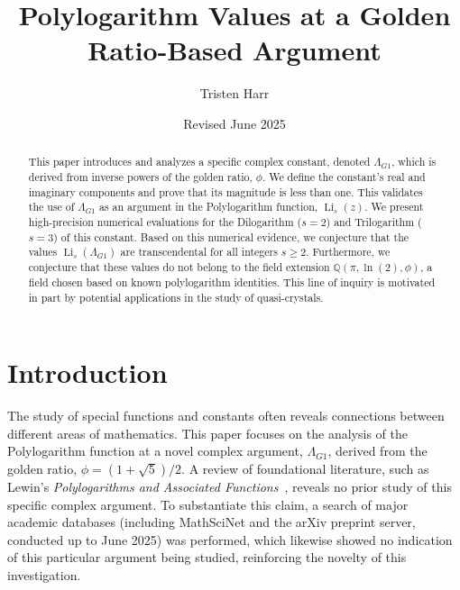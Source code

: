 \documentclass{amsart}
\theoremstyle{plain}
\theoremstyle{definition}
\theoremstyle{remark}
\DeclareMathOperator{\Li}{Li}
\newcommand{\LambdaG}{\Lambda_{G1}}
\newcommand{\phiG}{\phi}
\begin{document}
\title[Polylogarithms at a Golden Ratio Argument]{Polylogarithm Values at a Golden Ratio-Based Argument}
\author{Tristen Harr}
\date{Revised June 2025}

\begin{abstract}
This paper introduces and analyzes a specific complex constant, denoted $\LambdaG$, which is derived from inverse powers of the golden ratio, $\phiG$. We define the constant's real and imaginary components and prove that its magnitude is less than one. This validates the use of $\LambdaG$ as an argument in the Polylogarithm function, $\Li_s(z)$. We present high-precision numerical evaluations for the Dilogarithm ($s=2$) and Trilogarithm ($s=3$) of this constant. Based on this numerical evidence, we conjecture that the values $\Li_s(\LambdaG)$ are transcendental for all integers $s \ge 2$. Furthermore, we conjecture that these values do not belong to the field extension $\mathbb{Q}(\pi, \ln(2), \phiG)$, a field chosen based on known polylogarithm identities. This line of inquiry is motivated in part by potential applications in the study of quasi-crystals.
\end{abstract}

\maketitle

\section{Introduction}
The study of special functions and constants often reveals connections between different areas of mathematics. This paper focuses on the analysis of the Polylogarithm function at a novel complex argument, $\LambdaG$, derived from the golden ratio, $\phiG = (1+\sqrt{5})/2$. A review of foundational literature, such as Lewin's \textit{Polylogarithms and Associated Functions}~\cite{Lewin}, reveals no prior study of this specific complex argument. To substantiate this claim, a search of major academic databases (including MathSciNet and the arXiv preprint server, conducted up to June 2025) was performed, which likewise showed no indication of this particular argument being studied, reinforcing the novelty of this investigation.
\end{document}
